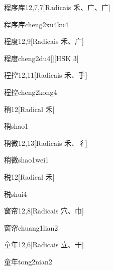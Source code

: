 \begin{entry}{程序库}{12,7,7}[Radicais ⽲、⼴、⼴]
  \begin{phonetics}{程序库}{cheng2xu4ku4}
  \end{phonetics}
\end{entry}

\begin{entry}{程度}{12,9}[Radicais ⽲、⼴]
  \begin{phonetics}{程度}{cheng2du4}[][HSK 3]
  \end{phonetics}
\end{entry}

\begin{entry}{程控}{12,11}[Radicais ⽲、⼿]
  \begin{phonetics}{程控}{cheng2kong4}
  \end{phonetics}
\end{entry}

\begin{entry}{稍}{12}[Radical ⽲]
  \begin{phonetics}{稍}{shao1}
  \end{phonetics}
\end{entry}

\begin{entry}{稍微}{12,13}[Radicais ⽲、⼻]
  \begin{phonetics}{稍微}{shao1wei1}
  \end{phonetics}
\end{entry}

\begin{entry}{税}{12}[Radical ⽲]
  \begin{phonetics}{税}{shui4}
  \end{phonetics}
\end{entry}

\begin{entry}{窗帘}{12,8}[Radicais ⽳、⼱]
  \begin{phonetics}{窗帘}{chuang1lian2}
  \end{phonetics}
\end{entry}

\begin{entry}{童年}{12,6}[Radicais ⽴、⼲]
  \begin{phonetics}{童年}{tong2nian2}
  \end{phonetics}
\end{entry}

